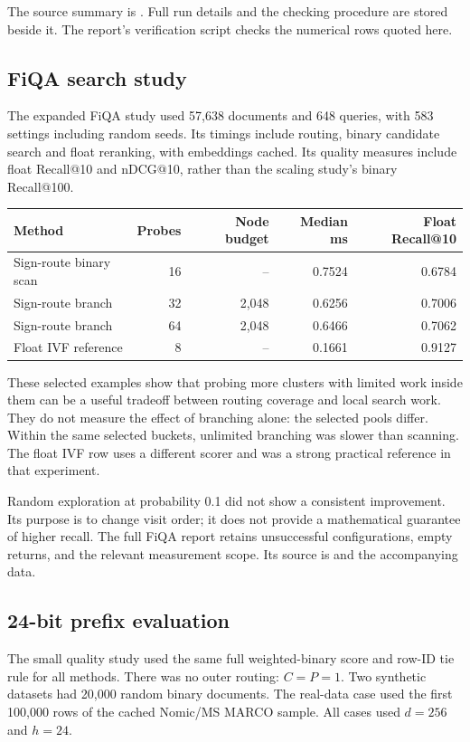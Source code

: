 The source summary is
. Full run details and the checking
procedure are stored beside it. The report's verification script checks the numerical rows quoted here.

\subsection{FiQA search study}
The expanded FiQA study used 57,638 documents and 648 queries, with 583 settings including random
seeds. Its timings include routing, binary candidate search and float reranking, with embeddings
cached. Its quality measures include float Recall@10 and nDCG@10, rather than the scaling study's
binary Recall@100.

\begin{center}\small
\begin{tabular}{@{}lrrrr@{}}\toprule
Method & Probes & Node budget & Median ms & Float Recall@10\\\midrule
Sign-route binary scan & 16 & -- & 0.7524 & 0.6784\\
Sign-route branch & 32 & 2,048 & 0.6256 & 0.7006\\
Sign-route branch & 64 & 2,048 & 0.6466 & 0.7062\\
Float IVF reference & 8 & -- & 0.1661 & 0.9127\\\bottomrule
\end{tabular}\normalsize\end{center}
These selected examples show that probing more clusters with limited work inside them can be
a useful tradeoff between routing coverage and local search work. They do not measure the effect of branching alone: the selected pools differ.
Within the same selected buckets, unlimited branching was slower than scanning. The float IVF
row uses a different scorer and was a strong practical reference in that experiment.

Random exploration at probability 0.1 did not show a consistent improvement. Its purpose is to
change visit order; it does not provide a mathematical guarantee of higher recall. The full
FiQA report retains unsuccessful configurations, empty returns, and the relevant measurement scope.
Its source is  and the accompanying data.

\subsection{24-bit prefix evaluation}
The small quality study used the same full weighted-binary score and row-ID tie rule for all
methods. There was no outer routing: $C=P=1$. Two synthetic datasets had 20,000 random binary
documents. The real-data case used the first 100,000 rows of the cached Nomic/MS MARCO sample.
All cases used $d=256$ and $h=24$.

